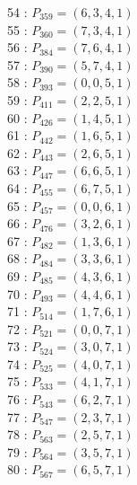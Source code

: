 \documentclass{article}
\begin{document}
{\begin{multicols}{3}
54 : $P_{359}=( 6, 3, 4, 1 )$\\
55 : $P_{360}=( 7, 3, 4, 1 )$\\
56 : $P_{384}=( 7, 6, 4, 1 )$\\
57 : $P_{390}=( 5, 7, 4, 1 )$\\
58 : $P_{393}=( 0, 0, 5, 1 )$\\
59 : $P_{411}=( 2, 2, 5, 1 )$\\
60 : $P_{426}=( 1, 4, 5, 1 )$\\
61 : $P_{442}=( 1, 6, 5, 1 )$\\
62 : $P_{443}=( 2, 6, 5, 1 )$\\
63 : $P_{447}=( 6, 6, 5, 1 )$\\
64 : $P_{455}=( 6, 7, 5, 1 )$\\
65 : $P_{457}=( 0, 0, 6, 1 )$\\
66 : $P_{476}=( 3, 2, 6, 1 )$\\
67 : $P_{482}=( 1, 3, 6, 1 )$\\
68 : $P_{484}=( 3, 3, 6, 1 )$\\
69 : $P_{485}=( 4, 3, 6, 1 )$\\
70 : $P_{493}=( 4, 4, 6, 1 )$\\
71 : $P_{514}=( 1, 7, 6, 1 )$\\
72 : $P_{521}=( 0, 0, 7, 1 )$\\
73 : $P_{524}=( 3, 0, 7, 1 )$\\
74 : $P_{525}=( 4, 0, 7, 1 )$\\
75 : $P_{533}=( 4, 1, 7, 1 )$\\
76 : $P_{543}=( 6, 2, 7, 1 )$\\
77 : $P_{547}=( 2, 3, 7, 1 )$\\
78 : $P_{563}=( 2, 5, 7, 1 )$\\
79 : $P_{564}=( 3, 5, 7, 1 )$\\
80 : $P_{567}=( 6, 5, 7, 1 )$\\
\end{multicols}


%


%


}%
\end{document}
